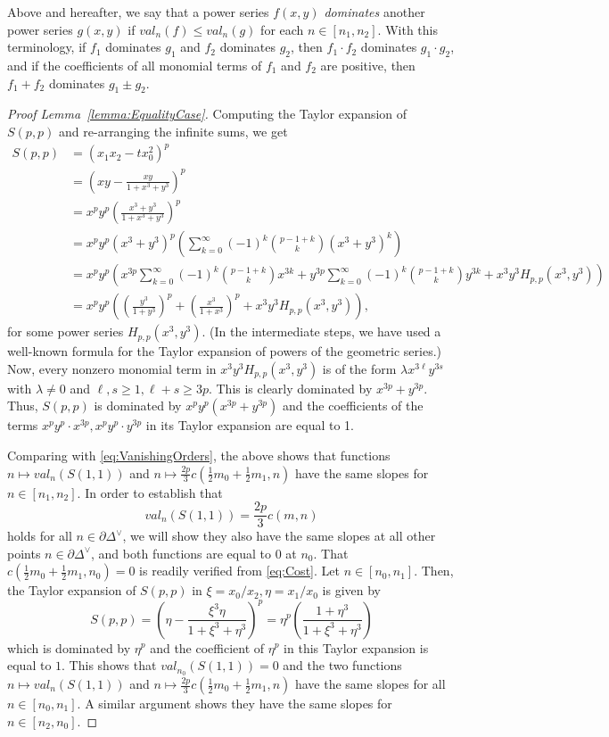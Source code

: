 \documentclass{article}
\begin{document}
Above and hereafter, we say that a power series $f(x,y)$ \emph{dominates} another power series $g(x,y)$ if $val_n(f)\leq val_n(g)$ for each $n\in[n_1,n_2]$. With this terminology, if $f_1$ dominates $g_1$ and $f_2$ dominates $g_2$, then $f_1\cdot f_2$ dominates $g_1\cdot g_2$, and if the coefficients of all monomial terms of $f_1$ and $f_2$ are positive, then $f_1+f_2$ dominates $g_1\pm g_2$. 
\begin{proof}[Proof Lemma~\ref{lemma:EqualityCase}]
Computing the Taylor expansion of $S(p,p)$ and re-arranging the infinite sums, we get
    \begin{align*}
        S(p,p)&=(x_1x_2-tx_0^2)^p \\
        &= \left(xy-\frac{xy}{1+x^3+y^3}\right)^p\\
        &=x^py^p\left(\frac{x^3+y^3}{1+x^3+y^3}\right)^p\\
        &=x^py^p(x^3+y^3)^p\left(\sum_{k=0}^\infty(-1)^k \binom{p-1+k}{k} (x^3+y^3)^k \right)\\
        &= x^py^p\left(x^{3p} \sum_{k=0}^\infty(-1)^k \binom{p-1+k}{k} x^{3k} + y^{3p}\sum_{k=0}^\infty(-1)^k \binom{p-1+k}{k} y^{3k} + x^3y^3 H_{p,p}(x^3,y^3)\right)\\
        &= x^py^p\left(\left(\frac{y^3}{1+y^3}\right)^p + \left(\frac{x^3}{1+x^3}\right)^p + x^3y^3H_{p,p}(x^3,y^3)\right),
    \end{align*}
    for some power series $H_{p,p}(x^3,y^3)$. (In the intermediate steps, we have used a well-known formula for the Taylor expansion of powers of the geometric series.) Now, every nonzero monomial term in $x^3y^3H_{p,p}(x^3,y^3)$ is of the form $\lambda x^{3\ell}y^{3s}$ with $\lambda \neq 0$ and $\ell,s\geq 1, \ell+s\geq 3p$. This is clearly dominated by $x^{3p}+y^{3p}$. Thus, $S(p,p)$ is dominated by $x^py^p(x^{3p}+y^{3p})$ and the coefficients of the terms $x^py^p\cdot x^{3p}, x^py^p\cdot y^{3p}$ in its Taylor expansion are equal to 1. 

     Comparing with \eqref{eq:VanishingOrders}, the above shows that functions $n\mapsto val_n(S(1,1))$ and $n\mapsto \frac{2p}{3}c(\frac{1}{2}m_0+\frac{1}{2}m_1,n)$ have the same slopes for $n\in[n_1,n_2]$. In order to establish that 
    \[
    val_n(S(1,1))=\frac{2p}{3}c(m,n)
    \]
    holds for all $n\in\partial\Delta^\vee$, we will show they also have the same slopes at all other points $n \in \partial\Delta^\vee$, and both functions are equal to $0$ at $n_0$. That $c(\frac{1}{2}m_0+\frac{1}{2}m_1,n_0)=0$ is readily verified from \eqref{eq:Cost}. Let $n\in[n_0,n_1]$. Then, the Taylor expansion of $S(p,p)$ in $\xi=x_0/x_2,\eta=x_1/x_0$ is given by 
    \[
    S(p,p)=\left(\eta-\frac{\xi^3\eta}{1+\xi^3+\eta^3}\right)^p=\eta^p\left(\frac{1+\eta^3}{1+\xi^3+\eta^3}\right)
    \]
    which is dominated by $\eta^p$ and the coefficient of $\eta^p$ in this Taylor expansion is equal to $1$. This shows that $val_{n_0}(S(1,1))=0$ and the two functions $n\mapsto val_n(S(1,1))$ and $n\mapsto \frac{2p}{3}c(\frac{1}{2}m_0+\frac{1}{2}m_1,n)$ have the same slopes for all $n\in[n_0,n_1]$. A similar argument shows they have the same slopes for $n\in[n_2,n_0]$.
\end{proof}
\end{document}

